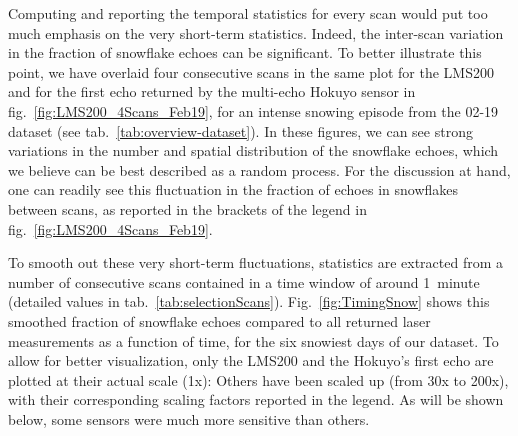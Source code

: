 Computing and reporting the temporal statistics for every scan would put too much emphasis on the very short-term statistics. Indeed, the inter-scan variation in the fraction of snowflake echoes can be significant. To better illustrate this point, we have overlaid four consecutive scans in the same plot for the LMS200 and for the first echo returned by the multi-echo Hokuyo sensor in fig.~\ref{fig:LMS200_4Scans_Feb19}, for an intense snowing episode from the 02-19 dataset (see tab.~\ref{tab:overview-dataset}). In these figures, we can see strong variations in the number and spatial distribution of the snowflake echoes, which we believe can be best described as a random process. For the discussion at hand, one can readily see this fluctuation in the fraction of echoes in snowflakes between scans, as reported in the brackets of the legend in fig.~\ref{fig:LMS200_4Scans_Feb19}. 

To smooth out these very short-term fluctuations, statistics are extracted from a number of consecutive scans contained in a time window of around 1~minute (detailed values in tab.~\ref{tab:selectionScans}). Fig.~\ref{fig:TimingSnow} shows this smoothed fraction of snowflake echoes compared to all returned laser measurements as a function of time, for the six snowiest days of our dataset. To allow for better visualization, only the LMS200 and the Hokuyo's first echo are plotted at their actual scale (1x): Others have been scaled up (from 30x to 200x), with their corresponding scaling factors reported in the legend. As will be shown below, some sensors were much more sensitive than others.

